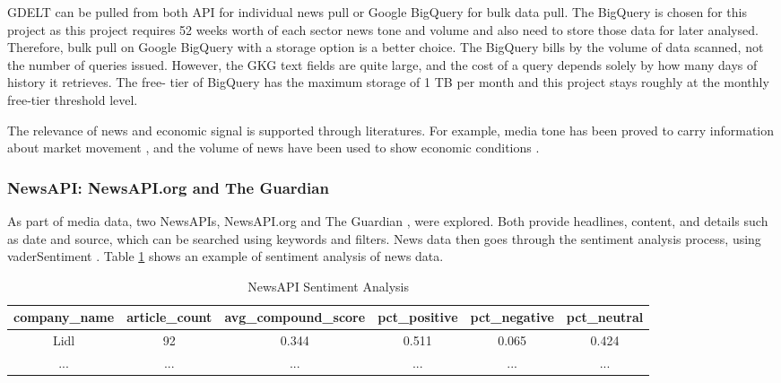 \documentclass[ %
                    author={Natchalin Iwsakul \\[0.4em] Inkaphol Siriwongwattana \\[0.4em] Tanaphan Kummaraphat \\[0.6em] Patorn Srisupap},,
                supervisor={Fernando Moreno-Pino},
                    degree={MSc},
                     title={Propensity Modelling for SME Commercial Lending Using Open Public Data
},
                  subtitle={Companies House and GDELT as predictors of first-time borrowing},
                      type={},
                      year={2026}]{dissertation}
\begin{document}
GDELT can be pulled from both API for individual news pull or Google BigQuery for bulk data pull. The BigQuery is chosen for this project as this project requires 52 weeks worth of each sector news tone and volume and also need to store those data for later analysed. Therefore, bulk pull on Google BigQuery with a storage option is a better choice. The BigQuery bills by the volume of data scanned, not the number of queries issued. However, the GKG text fields are quite large, and the cost of a query depends solely by how many days of history it retrieves. The free- tier of BigQuery has the maximum storage of 1 TB per month and this project stays roughly at the monthly free-tier threshold level.

The relevance of news and economic signal is supported through literatures. For example, media tone has been proved to carry information about market movement \cite{tetlock2007giving}, and the volume of news have been used to show economic conditions \cite{baker2016measuring}.

\subsubsection{NewsAPI: NewsAPI.org and The Guardian}
\label{sec:newsapi}

As part of media data, two NewsAPIs, NewsAPI.org \cite{newsapi.org} and The Guardian \cite{theguardian}, were explored. Both provide headlines, content, and details such as date and source, which can be searched using keywords and filters. News data then goes through the sentiment analysis process, using vaderSentiment \cite{hutto_cjhuttovadersentiment_2026}. Table \ref{newsapisentiment} shows an example of sentiment analysis of news data.

\begin{table}[h]
    \centering
    \begin{tabular}{cccccc}
    \toprule
    company\_name & article\_count & avg\_compound\_score & pct\_positive & pct\_negative & pct\_neutral\\
    \midrule
    Lidl & 92 & 0.344 & 0.511 & 0.065 & 0.424 \\
    ... & ... & ... & ...& ... & ... \\
    \bottomrule
    \end{tabular}
    \caption{NewsAPI Sentiment Analysis}
    \label{newsapisentiment}
\end{table}
\end{document}
